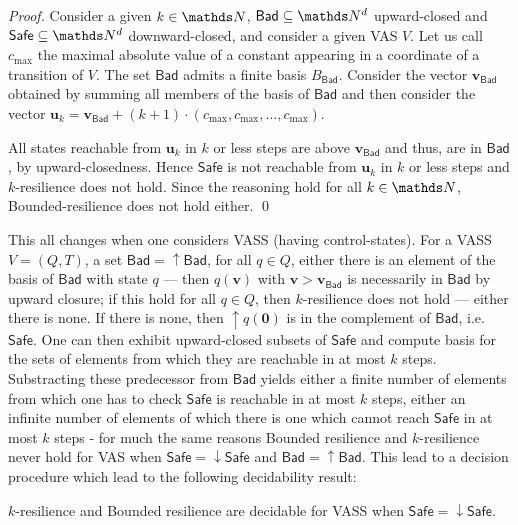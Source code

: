 \documentclass[runningheads]{llncs}
\newcommand{\Bad}{\textsf{Bad}}
\newcommand{\Safe}{\textsf{Safe}}
\begin{document}
\begin{proof}
Consider a given $k \in \N$,
 $\Bad \subseteq \N^d$ upward-closed and $\Safe \subseteq \N^d$ downward-closed, and
consider a given VAS $V$.
Let us call $c_{\max}$ the maximal absolute value of a constant appearing in a coordinate of a transition of $V$.
The set $\Bad$ admits a finite basis $B_\Bad$.
Consider the vector $\textbf{v}_{\Bad}$ obtained by summing all members of the basis of $\Bad$ and then consider the vector
$\textbf{u}_k = \textbf{v}_{\Bad} + (k+1) \cdot (c_{\max}, c_{\max}, \ldots, c_{\max})$.

All states reachable from $\textbf{u}_k$ in $k$ or less steps are above $ \textbf{v}_{\Bad} $
and thus, are in $\Bad$, by upward-closedness.
Hence  $\Safe$ is not reachable from $\textbf{u}_k$ in $k$ or less steps  and {$k$-resilience} does not hold.
Since the reasoning hold for all $k \in \N$, {\sc Bounded-resilience} does not hold either.
\qed
\end{proof}

This all changes when one considers VASS (having control-states). For a VASS $V = (Q,T)$, a set $\Bad = \uparrow \Bad$, for all $q \in Q$, either there is an element of the basis of $\Bad$ with state $q$ \----
then $q(\textbf{v})$ with $\textbf{v} > \textbf{v}_{\Bad}$ is necessarily in $\Bad$ by upward closure; if this hold for all $q \in Q$, then $k$-resilience does not hold \---- either there is none. If there is none, then 
$\uparrow q(\textbf{0})$
 is in the complement of $\Bad$, i.e. $\Safe$. One can then exhibit upward-closed subsets of 
 $\Safe$ and compute basis for the sets of elements from which they are reachable in at most $k$ steps. 
Substracting these predecessor from $\Bad$ yields either a finite number of elements from which one has to check $\Safe$ is reachable in at most $k$ steps, either an infinite number of elements of which there is one which cannot reach $\Safe$ in at most $k$ steps \-- for much the same reasons {\sc Bounded resilience} and {\sc $k$-resilience} never hold for VAS when $\Safe = \downarrow \Safe$ and $\Bad = \uparrow \Bad$. This lead to a decision procedure
 which lead to the following decidability result:
\begin{theorem}
{\sc $k$-resilience }  and {\sc Bounded resilience} are decidable for VASS when 
$\Safe = \downarrow \Safe$.
\end{theorem}
\end{document}
